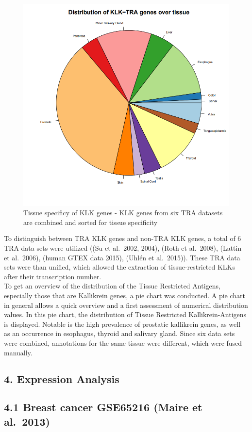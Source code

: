 \documentclass[
]{article}
\begin{document}
\begin{figure}

{\centering \includegraphics[width=0.5\linewidth]{images/piechart_TRA} 

}

\caption{Tissue specificy of KLK genes - KLK genes from six TRA datasets are combined and sorted for tissue specificity}\label{fig:TRA -piechart}
\end{figure}

To distinguish between TRA KLK genes and non-TRA KLK genes, a total of 6
TRA data sets were utilized ((Su et al.~2002, 2004), (Roth et al.~2008),
(Lattin et al.~2006), (human GTEX data 2015), (Uhlén et al.~2015)).
These TRA data sets were than unified, which allowed the extraction of
tissue-restricted KLKs after their transcription number.\\
To get an overview of the distribution of the Tissue Restricted
Antigens, especially those that are Kallikrein genes, a pie chart was
conducted. A pie chart in general allows a quick overview and a first
assessment of numerical distribution values. In this pie chart, the
distribution of Tissue Restricted Kallikrein-Antigens is displayed.
Notable is the high prevalence of prostatic kallikrein genes, as well as
an occurrence in esophagus, thyroid and salivary gland. Since six data
sets were combined, annotations for the same tissue were different,
which were fused manually.

\hypertarget{expression-analysis}{%
\subsection{4. Expression Analysis}\label{expression-analysis}}

\hypertarget{breast-cancer-gse65216-maire-et-al.-2013}{%
\subsection{4.1 Breast cancer GSE65216 (Maire et
al.~2013)}\label{breast-cancer-gse65216-maire-et-al.-2013}}
\end{document}
